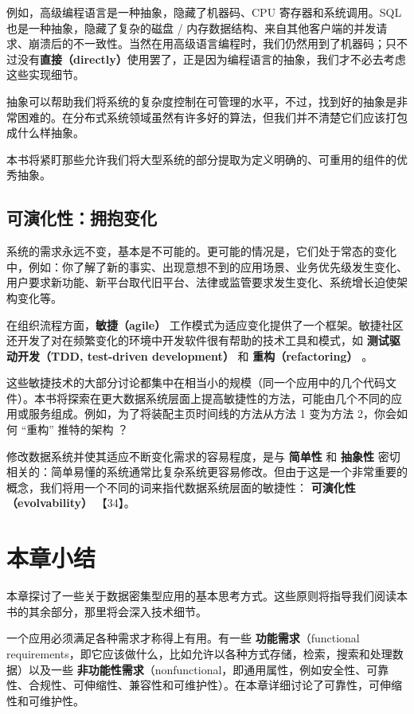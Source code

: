 例如，高级编程语言是一种抽象，隐藏了机器码、CPU 寄存器和系统调用。SQL 也是一种抽象，隐藏了复杂的磁盘 / 内存数据结构、来自其他客户端的并发请求、崩溃后的不一致性。当然在用高级语言编程时，我们仍然用到了机器码；只不过没有\textbf{直接（directly）}使用罢了，正是因为编程语言的抽象，我们才不必去考虑这些实现细节。

抽象可以帮助我们将系统的复杂度控制在可管理的水平，不过，找到好的抽象是非常困难的。在分布式系统领域虽然有许多好的算法，但我们并不清楚它们应该打包成什么样抽象。

本书将紧盯那些允许我们将大型系统的部分提取为定义明确的、可重用的组件的优秀抽象。

\subsection{可演化性：拥抱变化}

系统的需求永远不变，基本是不可能的。更可能的情况是，它们处于常态的变化中，例如：你了解了新的事实、出现意想不到的应用场景、业务优先级发生变化、用户要求新功能、新平台取代旧平台、法律或监管要求发生变化、系统增长迫使架构变化等。

在组织流程方面，\textbf{敏捷（agile）} 工作模式为适应变化提供了一个框架。敏捷社区还开发了对在频繁变化的环境中开发软件很有帮助的技术工具和模式，如 \textbf{测试驱动开发（TDD, test-driven development）} 和 \textbf{重构（refactoring）} 。

这些敏捷技术的大部分讨论都集中在相当小的规模（同一个应用中的几个代码文件）。本书将探索在更大数据系统层面上提高敏捷性的方法，可能由几个不同的应用或服务组成。例如，为了将装配主页时间线的方法从方法 1 变为方法 2，你会如何 “重构” 推特的架构 ？

修改数据系统并使其适应不断变化需求的容易程度，是与 \textbf{简单性} 和 \textbf{抽象性} 密切相关的：简单易懂的系统通常比复杂系统更容易修改。但由于这是一个非常重要的概念，我们将用一个不同的词来指代数据系统层面的敏捷性： \textbf{可演化性（evolvability）} 【34】。

\section{本章小结}

本章探讨了一些关于数据密集型应用的基本思考方式。这些原则将指导我们阅读本书的其余部分，那里将会深入技术细节。

一个应用必须满足各种需求才称得上有用。有一些 \textbf{功能需求}（functional requirements，即它应该做什么，比如允许以各种方式存储，检索，搜索和处理数据）以及一些 \textbf{非功能性需求}（nonfunctional，即通用属性，例如安全性、可靠性、合规性、可伸缩性、兼容性和可维护性）。在本章详细讨论了可靠性，可伸缩性和可维护性。


